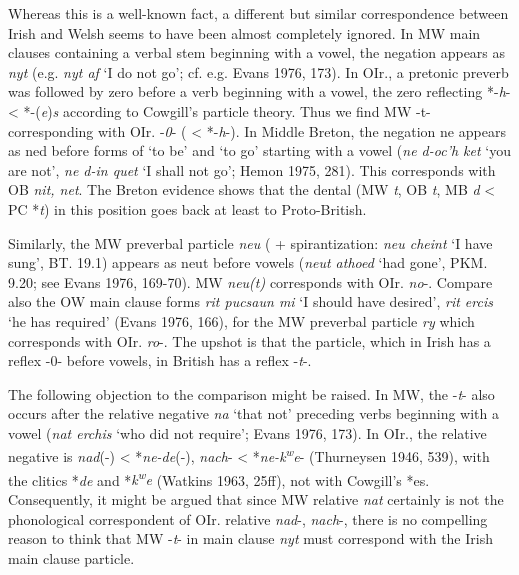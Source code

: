 Whereas this is a well-known fact, a different but similar correspondence between Irish and Welsh seems to have been almost completely ignored. In MW main clauses containing a verbal stem beginning with a vowel, the negation appears as \textit{nyt} (e.g. \textit{nyt af} `I do not go'; cf. e.g. Evans
1976, 173). In OIr., a pretonic preverb was followed by zero before a verb beginning with a vowel, the zero reflecting *-\textit{h}- < *-(\textit{e})\textit{s} according to Cowgill's particle theory. Thus we find MW -t- corresponding with OIr. -\textit{0}- ( < *-\textit{h}-). In Middle Breton, the negation ne appears as ned before forms of `to be' and `to go' starting with a vowel (\textit{ne d-oc'h ket} `you are not', \textit{ne d-in quet} `I shall not go'; Hemon 1975, 281). This corresponds
with OB \textit{nit, net}. The Breton evidence shows that the dental (MW \textit{t}, OB \textit{t}, MB \textit{d} < PC *\textit{t}) in this position goes back at least to Proto-British.

Similarly, the MW preverbal particle \textit{neu} ( + spirantization: \textit{neu cheint} `I have sung', BT. 19.1) appears as neut before vowels (\textit{neut athoed} `had gone', PKM. 9.20; see Evans 1976, 169-70). MW \textit{neu(t)} corresponds with OIr. \textit{no}-. Compare also the OW main clause forms \textit{rit pucsaun mi} `I should have desired', \textit{rit ercis} `he has required' (Evans 1976, 166), for the MW preverbal particle \textit{ry} which corresponds with OIr. \textit{ro}-. The upshot is that the particle, which in Irish has a reflex -0- before vowels, in British has a reflex -\textit{t}-.

The following objection to the comparison might be raised. In MW, the -\textit{t}- also occurs after the relative negative \textit{na} `that not' preceding verbs beginning with a vowel (\textit{nat erchis} `who did not require'; Evans 1976, 173). In OIr., the relative negative is \textit{nad}(-) < *\textit{ne-de}(-), \textit{nach}- < *\textit{ne-k\textsuperscript{w}e}- (Thurneysen 1946, 539), with the clitics *\textit{de} and *\textit{k\textsuperscript{w}e} (Watkins 1963, 25ff), not with Cowgill's *es. Consequently, it might be argued that since
MW relative \textit{nat} certainly is not the phonological correspondent of OIr.
relative \textit{nad}-, \textit{nach}-, there is no compelling reason to think that MW -\textit{t}- in
main clause \textit{nyt} must correspond with the Irish main clause particle.

